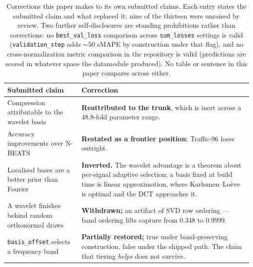 
\begin{table}[t]
\caption{Corrections this paper makes to its own submitted claims. Each
entry states the submitted claim and what replaced it; nine of the thirteen
were unraised by review. Two further self-disclosures are standing
prohibitions rather than corrections: no \texttt{best\_val\_loss}
comparison across \texttt{sum\_losses} settings is valid
(\texttt{validation\_step} adds ${\sim}50$ sMAPE by construction under that
flag), and no cross-normalization metric comparison in the repository is
valid (predictions are scored in whatever space the datamodule produced). No
table or sentence in this paper compares across either.}
\label{tab:corrections_ledger}
\centering
\small
\setlength{\tabcolsep}{4pt}
\begin{tabular}{p{}p{}}
  \toprule
  Submitted claim & Correction \\
  \midrule
  Compression attributable to the wavelet basis &
    \textbf{Reattributed to the trunk}, which is inert across a
    48.8-fold parameter range. \\
  \addlinespace[2pt]
  Accuracy improvements over N-BEATS &
    \textbf{Restated as a frontier position}; Traffic-96 loses outright. \\
  \addlinespace[2pt]
  Localised bases are a better prior than Fourier &
    \textbf{Inverted.} The wavelet advantage is a theorem about per-signal
    adaptive selection; a basis fixed at build time is linear approximation,
    where Karhunen--Lo\`eve is optimal and the DCT approaches it. \\
  \addlinespace[2pt]
  A wavelet finishes behind random orthonormal draws &
    \textbf{Withdrawn;} an artifact of SVD row ordering --- band ordering
    lifts capture from 0.348 to 0.9999. \\
  \addlinespace[2pt]
  \texttt{basis\_offset} selects a frequency band &
    \textbf{Partially restored;} true under band-preserving construction,
    false under the shipped path. The claim that tiering \emph{helps} does
    not survive. \\

\end{tabular}
\end{table}
